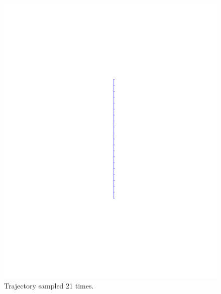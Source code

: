 \begin{figure}
  \centering
  \begin{minipage}[b]{0.4\textwidth}
    \includegraphics[width=\textwidth]{figures/method/trajectory-sampled}
    \caption{Trajectory sampled 21 times.}
  \end{minipage}
  \hfill
  \begin{minipage}[b]{0.4\textwidth}

\end{minipage}
\end{figure}
